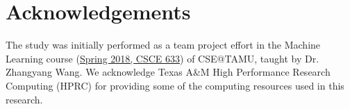 \documentclass[10pt,twocolumn,letterpaper]{article}
\begin{document}

\section*{Acknowledgements}
The study was initially performed as a team project effort in the Machine Learning course (\href{http://people.tamu.edu/~atlaswang/18CSCE633.html}{Spring 2018, CSCE 633}) of CSE@TAMU, taught by Dr. Zhangyang Wang. We acknowledge Texas A\&M High Performance Research Computing (HPRC) for providing some of the computing resources used in this research.




\end{document}

